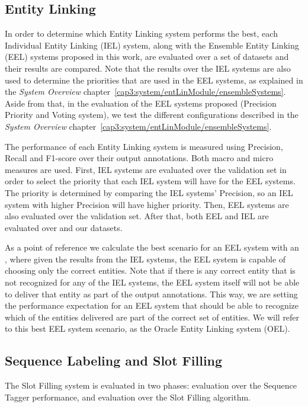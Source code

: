 \subsection{Entity Linking}
\label{cap4:experimentalDesign/entityLinking}
In order to determine which Entity Linking system performs the best, each Individual Entity 
Linking (IEL) system, along with the Ensemble Entity Linking (EEL) systems proposed in this work, 
are evaluated over a set of datasets and their results are compared. Note that the results over 
the IEL systems are also used to determine the priorities that are used in the EEL systems, as 
explained in the \textit{System Overview} chapter~\ref{cap3:system/entLinModule/ensembleSystems}. 
Aside from that, in the evaluation of 
the EEL systems proposed (Precision Priority and Voting system), we test the different 
configurations described in the \textit{System Overview} chapter~\ref{cap3:system/entLinModule/ensembleSystems}. 

The performance of each Entity Linking system is measured using Precision, Recall and F1-score 
over their output annotations. Both macro and micro measures are used. First, IEL systems are 
evaluated over the \LCQuADtwo{} validation set in order to select the priority that each IEL system 
will have for the EEL systems. The priority is determined by comparing the IEL systems’ Precision, 
so an IEL system with higher Precision will have higher priority. Then, EEL systems are also 
evaluated over the \LCQuADtwo{} validation set. After that, both EEL and IEL are evaluated over 
\QALDseven{} and our \WikiSPARQL{} datasets.

As a point of reference we calculate the best scenario for an EEL system with an , 
where given the results from the IEL systems, the EEL system is capable of choosing only the 
correct entities. Note that if there is any correct entity that is not recognized for any of the 
IEL systems, the EEL system itself will not be able to deliver that entity as part of the output 
annotations. This way, we are setting the performance expectation for an EEL system that should 
be able to recognize which of the entities delivered are part of the correct set of entities. We 
will refer to this best EEL system scenario, as the Oracle Entity Linking system (OEL).


\subsection{Sequence Labeling and Slot Filling}
\label{cap4:experimentalDesign/seqLabAndSlotFilling}
The Slot Filling system is evaluated in two phases: evaluation over the Sequence Tagger 
performance, and evaluation over the Slot Filling algorithm. 

